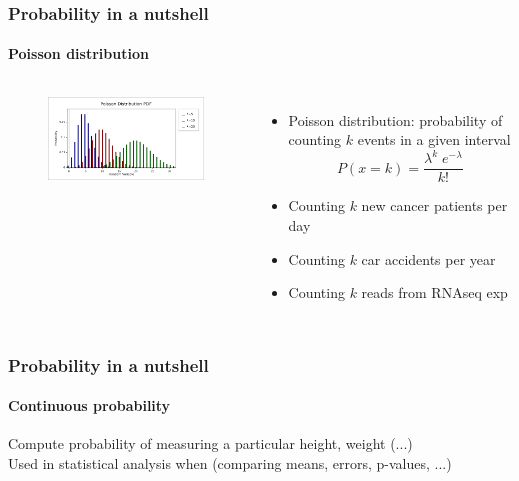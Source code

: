 \documentclass[aspectratio=43]{beamer}
\begin{document}
\begin{frame}
	
	\frametitle{Probability in a nutshell}
	\framesubtitle{Poisson distribution}
	
	\footnotesize
	
	\begin{columns}	
		
		
		\begin{figure}
			\includegraphics[width = 5 cm]{plots/part1/poisson.png}
		\end{figure}
		
		
		\begin{itemize}
			\item Poisson distribution: probability of counting $k$ events in a given interval
			\begin{equation}
				P(x = k) = \frac{\lambda^{k} \; e^{-\lambda}}{k!} \nonumber
			\end{equation}
			\item Counting $k$ new cancer patients per day
			\item Counting $k$ car accidents per year
			\item Counting $k$ reads from RNAseq exp
		\end{itemize}
		
	\end{columns}

\end{frame}

\begin{frame}
	
	\frametitle{Probability in a nutshell}
	\framesubtitle{Continuous probability}

	\footnotesize

	Compute probability of measuring a particular height, weight (...) \\
	Used in statistical analysis when (comparing means, errors, p-values, ...)

\end{frame}
\end{document}
